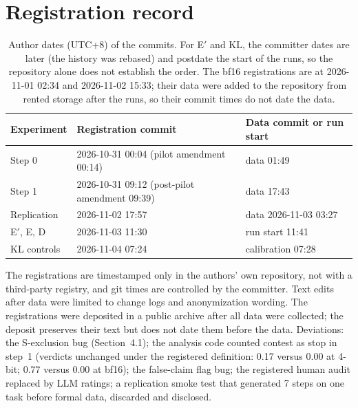 \documentclass[11pt]{article}
\newif\ifshowtodos
\newcommand{\AUTHORTODO}[1]{\ifshowtodos\textcolor{red}{\textbf{[AUTHOR TODO: #1]}}\fi}
\begin{document}
\section{Registration record}\label{app:prereg}
\begin{table}[h]
\centering\small
\begin{tabular}{@{}lll@{}}
\toprule
Experiment & Registration commit & Data commit or run start\\
\midrule
Step 0 & 2026-10-31 00:04 (pilot amendment 00:14) & data 01:49\\
Step 1 & 2026-10-31 09:12 (post-pilot amendment 09:39) & data 17:43\\
Replication & 2026-11-02 17:57 & data 2026-11-03 03:27\\
E$'$, E, D & 2026-11-03 11:30 & run start 11:41\\
KL controls & 2026-11-04 07:24 & calibration 07:28\\
\bottomrule
\end{tabular}
\caption{Author dates (UTC+8) of the commits. For E$'$ and KL, the committer dates are later (the history was rebased) and postdate the start of the runs, so the repository alone does not establish the order. The bf16 registrations are at 2026-11-01 02:34 and 2026-11-02 15:33; their data were added to the repository from rented storage after the runs, so their commit times do not date the data.}
\end{table}
The registrations are timestamped only in the authors' own repository, not with a third-party registry, and git times are controlled by the committer. Text edits after data were limited to change logs and anonymization wording. \AUTHORTODO{Archive link and deposit date.} The registrations were deposited in a public archive after all data were collected; the deposit preserves their text but does not date them before the data. Deviations: the S-exclusion bug (Section~4.1); the analysis code counted contest as stop in step~1 (verdicts unchanged under the registered definition: 0.17 versus 0.00 at 4-bit; 0.77 versus 0.00 at bf16); the false-claim flag bug; the registered human audit replaced by LLM ratings; a replication smoke test that generated 7 steps on one task before formal data, discarded and disclosed.
\end{document}
